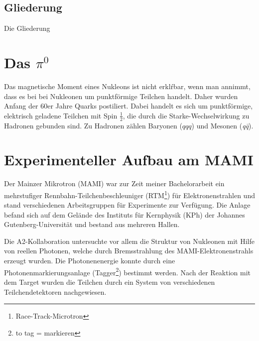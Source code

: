 \documentclass[a4paper,11pt,oneside,final,german,openbib,pdftex]{scrbook}
\begin{document}
{	
\section{Gliederung}

Die Gliederung


\chapter{Das $\pi^0$ }
Das magnetische Moment eines Nukleons ist nicht erkl\'rbar, wenn man annimmt, dass es bei bei Nukleonen um punktf\"ormige Teilchen handelt. Daher wurden Anfang der 60er Jahre Quarks postiliert. Dabei handelt es sich um punktf\"ormige, elektrisch geladene Teilchen mit Spin $\frac{1}{2}$, die durch die Starke-Wechselwirkung zu Hadronen gebunden sind. Zu Hadronen z\"ahlen Baryonen ($qqq$) und Mesonen (\textit{q\={q}}). 


\chapter{Experimenteller Aufbau am MAMI}





Der Mainzer Mikrotron (MAMI) war zur Zeit meiner Bachelorarbeit ein mehrstufiger Rennbahn-Teilchenbeschleuniger (RTM\footnote{Race-Track-Microtron}) für Elektronenstrahlen und stand verschiedenen Arbeitsgruppen
 für Experimente zur Verfügung. Die Anlage befand sich auf dem Gelände des Instituts für Kernphysik (KPh) der Johannes Gutenberg-Universität 
und bestand aus mehreren Hallen.

Die A2-Kollaboration untersuchte vor allem die Struktur von Nukleonen mit Hilfe von reellen Photonen, welche durch Bremsstrahlung des MAMI-Elektronenstrahls erzeugt wurden. Die Photonenenergie konnte durch eine Photonenmarkierungsanlage (Tagger\footnote{to tag = markieren}) bestimmt werden. Nach der Reaktion mit dem Target wurden die Teilchen durch ein System von verschiedenen Teilchendetektoren nachgewiesen.

}
\end{document}

